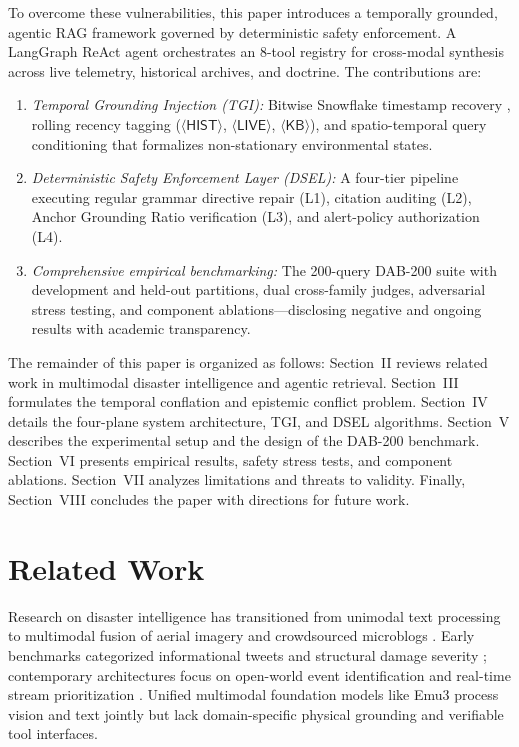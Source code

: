 \documentclass[conference]{IEEEtran}
\begin{document}
To overcome these vulnerabilities, this paper introduces a temporally grounded, agentic RAG framework governed by deterministic safety enforcement. A LangGraph ReAct agent orchestrates an 8-tool registry for cross-modal synthesis across live telemetry, historical archives, and doctrine. The contributions are:
\begin{enumerate}
    \item \textit{Temporal Grounding Injection (TGI):} Bitwise Snowflake timestamp recovery \cite{olteanu2015}, rolling recency tagging ($\langle\mathsf{HIST}\rangle$, $\langle\mathsf{LIVE}\rangle$, $\langle\mathsf{KB}\rangle$), and spatio-temporal query conditioning that formalizes non-stationary environmental states.
    \item \textit{Deterministic Safety Enforcement Layer (DSEL):} A four-tier pipeline executing regular grammar directive repair (L1), citation auditing (L2), Anchor Grounding Ratio verification (L3), and alert-policy authorization (L4).
    \item \textit{Comprehensive empirical benchmarking:} The 200-query DAB-200 suite \cite{dab200} with development and held-out partitions, dual cross-family judges, adversarial stress testing, and component ablations---disclosing negative and ongoing results with academic transparency.
\end{enumerate}

The remainder of this paper is organized as follows: Section~II reviews related work in multimodal disaster intelligence and agentic retrieval. Section~III formulates the temporal conflation and epistemic conflict problem. Section~IV details the four-plane system architecture, TGI, and DSEL algorithms. Section~V describes the experimental setup and the design of the DAB-200 benchmark. Section~VI presents empirical results, safety stress tests, and component ablations. Section~VII analyzes limitations and threats to validity. Finally, Section~VIII concludes the paper with directions for future work.

\section{Related Work}
Research on disaster intelligence has transitioned from unimodal text processing to multimodal fusion of aerial imagery and crowdsourced microblogs \cite{crisismmd,ofli,abavisani}. Early benchmarks categorized informational tweets and structural damage severity \cite{humaid,olteanu2014}; contemporary architectures focus on open-world event identification \cite{yu2025} and real-time stream prioritization \cite{kim2025}. Unified multimodal foundation models like Emu3 \cite{emu3} process vision and text jointly but lack domain-specific physical grounding and verifiable tool interfaces.
\end{document}
